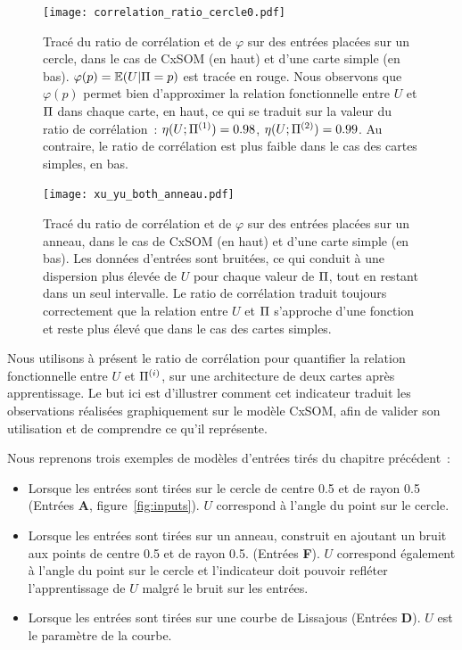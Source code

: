 \documentclass[../main]{subfiles}
\begin{document}
\begin{figure}
    \centering\texttt{[image: correlation\_ratio\_cercle0.pdf]}
    \caption{Tracé du ratio de corrélation et de $\varphi$ sur des entrées placées sur un cercle, dans le cas de CxSOM (en haut) et d'une carte simple (en bas). $\varphi(p) = \mathbb{E}(U|\Pi =p)$ est tracée en rouge.
    Nous observons que $\varphi(p)$ permet bien d'approximer la relation fonctionnelle entre $U$ et $\Pi$ dans chaque carte, en haut, ce qui se traduit sur la valeur du ratio de corrélation~: $\eta(U;\Pi^{({1})}) = 0.98$, $\eta(U;\Pi^{({2})}) = 0.99$. Au contraire, le ratio de corrélation est plus faible dans le cas des cartes simples, en bas.
     \label{fig:cr_xp}}
\end{figure}

\begin{figure}
   \centering \texttt{[image: xu\_yu\_both\_anneau.pdf]}
    \caption{Tracé du ratio de corrélation et de $\varphi$ sur des entrées placées sur un anneau, dans le cas de CxSOM (en haut) et d'une carte simple (en bas). Les données d'entrées sont bruitées, ce qui conduit à une dispersion plus élevée de $U$ pour chaque valeur de $\Pi$, tout en restant dans un seul intervalle. Le ratio de corrélation traduit toujours correctement que la relation entre $U$ et $\Pi$ s'approche d'une fonction et reste plus élevé que dans le cas des cartes simples. \label{fig:cr_bruit}}
\end{figure}

Nous utilisons à présent le ratio de corrélation pour quantifier la relation fonctionnelle entre $U$ et $\Pi^{({i})}$, sur une architecture de deux cartes après apprentissage. Le but ici est d'illustrer comment cet indicateur traduit les observations réalisées graphiquement sur le modèle CxSOM, afin de valider son utilisation et de comprendre ce qu'il représente.

Nous reprenons trois exemples de modèles d'entrées tirés du chapitre précédent~:
\begin{itemize}
    \item Lorsque les entrées sont tirées sur le cercle de centre 0.5 et de rayon 0.5 (Entrées \textbf{A}, figure~\ref{fig:inputs}). $U$ correspond à l'angle du point sur le cercle.
    \item Lorsque les entrées sont tirées sur un anneau, construit en ajoutant un bruit aux points de centre 0.5 et de rayon 0.5. (Entrées \textbf{F}). $U$ correspond également à l'angle du point sur le cercle et l'indicateur doit pouvoir refléter l'apprentissage de $U$ malgré le bruit sur les entrées.
    \item Lorsque les entrées sont tirées sur une courbe de Lissajous (Entrées \textbf{D}). $U$ est le paramètre de la courbe.
\end{itemize}
\end{document}
